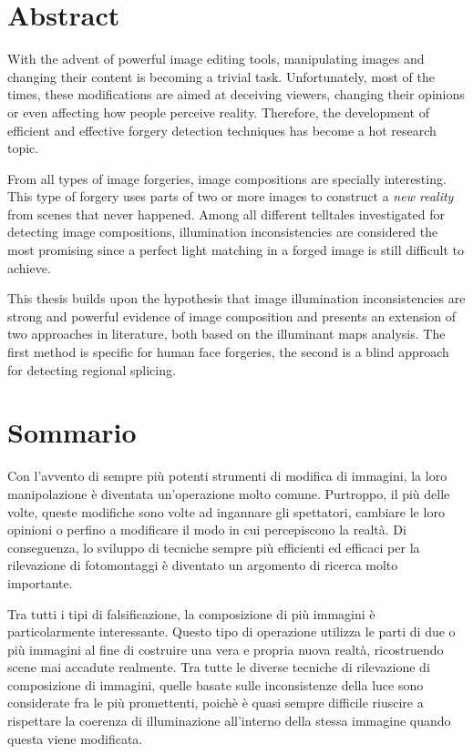 \chapter*{Abstract}

With the advent of powerful image editing tools, manipulating images and changing their content is becoming a trivial task. Unfortunately, most of the times, these modifications are aimed at deceiving viewers, changing their opinions or even affecting how people perceive reality. Therefore, the development of efficient and effective forgery detection techniques has become a hot research topic. 

From all types of image forgeries, image compositions are specially interesting. This type of forgery uses parts of two or more images to construct a \emph{new reality} from scenes that never happened. Among all different telltales investigated for detecting image compositions, illumination inconsistencies are considered the most promising since a perfect light matching in a forged image is still difficult to achieve. 

This thesis builds upon the hypothesis that image illumination inconsistencies are strong and powerful evidence of image composition and presents an extension of two approaches in literature, both based on the illuminant maps analysis. The first method is specific for human face forgeries, the second is a blind approach for detecting regional splicing.


\chapter*{Sommario}

Con l'avvento di sempre più potenti strumenti di modifica di immagini, la loro manipolazione è diventata un'operazione molto comune. Purtroppo, il più delle volte, queste modifiche sono volte ad ingannare gli spettatori, cambiare le loro opinioni o perfino a modificare il modo in cui percepiscono la realtà. Di conseguenza, lo sviluppo di tecniche sempre più efficienti ed efficaci per la rilevazione di fotomontaggi  è diventato un argomento di ricerca molto importante. 


Tra tutti i tipi di falsificazione, la composizione di più immagini è particolarmente interessante. Questo tipo di operazione utilizza le parti di due o più immagini al fine di costruire una vera e propria nuova realtà, ricostruendo scene mai accadute realmente. Tra tutte le diverse tecniche di rilevazione di composizione di immagini, quelle basate sulle inconsistenze della luce sono considerate fra le più promettenti, poichè è quasi sempre difficile riuscire a rispettare la coerenza di illuminazione all'interno della stessa immagine quando questa viene modificata.


